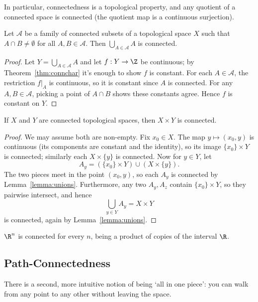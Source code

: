 In particular, connectedness is a topological property, and any quotient of a connected space is connected (the quotient map is a continuous surjection).

\begin{lemma}\label{lemma:unions}
    Let $\mathcal{A}$ be a family of connected subsets of a topological space $X$ such that $A \cap B \neq \emptyset$ for all $A, B \in \mathcal{A}$. Then $\bigcup_{A \in \mathcal{A}} A$ is connected.
\end{lemma}
\begin{proof}
    Let $Y = \bigcup_{A \in \mathcal{A}} A$ and let $f: Y \rightarrow \Z$ be continuous; by Theorem~\ref{thm:connchar} it's enough to show $f$ is constant. For each $A \in \mathcal{A}$, the restriction $f|_A$ is continuous, so it is constant since $A$ is connected. For any $A, B \in \mathcal{A}$, picking a point of $A \cap B$ shows these constants agree. Hence $f$ is constant on $Y$.
\end{proof}

\begin{theorem}
    If $X$ and $Y$ are connected topological spaces, then $X \times Y$ is connected.
\end{theorem}
\begin{proof}
    We may assume both are non-empty. Fix $x_0 \in X$. The map $y \mapsto (x_0, y)$ is continuous (its components are constant and the identity), so its image $\{x_0\} \times Y$ is connected; similarly each $X \times \{y\}$ is connected. Now for $y \in Y$, let
    $$
    A_y = (\{x_0\} \times Y) \cup (X \times \{y\}).
    $$
    The two pieces meet in the point $(x_0, y)$, so each $A_y$ is connected by Lemma~\ref{lemma:unions}. Furthermore, any two $A_y, A_z$ contain $\{x_0\} \times Y$, so they pairwise intersect, and hence
    $$
    \bigcup_{y \in Y} A_y = X \times Y
    $$
    is connected, again by Lemma~\ref{lemma:unions}.
\end{proof}

\begin{example}
    $\R^n$ is connected for every $n$, being a product of copies of the interval $\R$.
\end{example}

\subsection{Path-Connectedness}

There is a second, more intuitive notion of being `all in one piece': you can walk from any point to any other without leaving the space.

